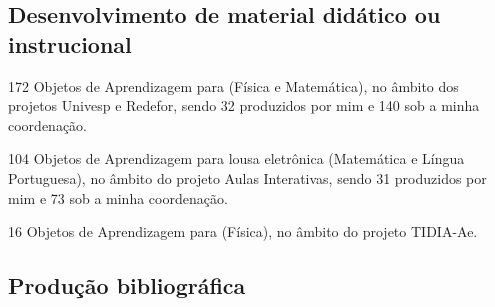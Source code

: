 \subsection{Desenvolvimento de material didático ou instrucional}

\begin{compactitem}
  \item 172 Objetos de Aprendizagem para  (Física e Matemática), no âmbito dos projetos Univesp e Redefor, sendo 32 produzidos por mim e 140 sob a minha coordenação.
  \item 104 Objetos de Aprendizagem para lousa eletrônica (Matemática e Língua Portuguesa), no âmbito do projeto Aulas Interativas, sendo 31 produzidos por mim e 73 sob a minha coordenação.
  \item 16 Objetos de Aprendizagem para  (Física), no âmbito do projeto TIDIA-Ae.
\end{compactitem}

\subsection{Produção bibliográfica}

